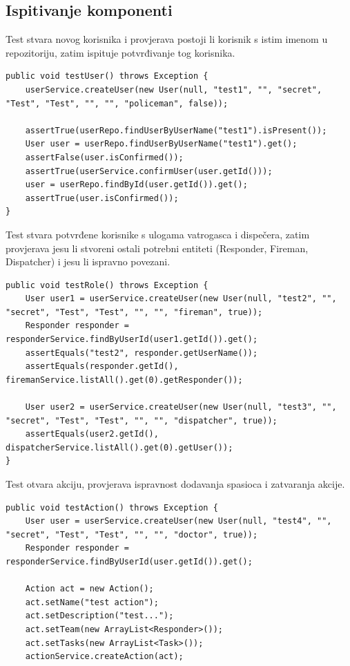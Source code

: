 			\subsection{Ispitivanje komponenti}
			\begin{packed_enum}
			
				\item Test stvara novog korisnika i provjerava postoji li korisnik s istim imenom u repozitoriju, zatim ispituje potvrđivanje tog korisnika.
				\begin{lstlisting}
public void testUser() throws Exception {
	userService.createUser(new User(null, "test1", "", "secret", "Test", "Test", "", "", "policeman", false));
	
	assertTrue(userRepo.findUserByUserName("test1").isPresent());
	User user = userRepo.findUserByUserName("test1").get();
	assertFalse(user.isConfirmed());
	assertTrue(userService.confirmUser(user.getId()));
	user = userRepo.findById(user.getId()).get();
	assertTrue(user.isConfirmed());
}
				\end{lstlisting}
				\item Test stvara potvrđene korisnike s ulogama vatrogasca i dispečera, zatim provjerava jesu li stvoreni ostali potrebni entiteti (Responder, Fireman, Dispatcher) i jesu li ispravno povezani.
				\begin{lstlisting}
public void testRole() throws Exception {
	User user1 = userService.createUser(new User(null, "test2", "", "secret", "Test", "Test", "", "", "fireman", true));
	Responder responder = responderService.findByUserId(user1.getId()).get();
	assertEquals("test2", responder.getUserName());
	assertEquals(responder.getId(), firemanService.listAll().get(0).getResponder());
	
	User user2 = userService.createUser(new User(null, "test3", "", "secret", "Test", "Test", "", "", "dispatcher", true));
	assertEquals(user2.getId(), dispatcherService.listAll().get(0).getUser());
}
				\end{lstlisting}
				\item Test otvara akciju, provjerava ispravnost dodavanja spasioca i zatvaranja akcije.
				\begin{lstlisting}
public void testAction() throws Exception {
	User user = userService.createUser(new User(null, "test4", "", "secret", "Test", "Test", "", "", "doctor", true));
	Responder responder = responderService.findByUserId(user.getId()).get();
	
	Action act = new Action();
	act.setName("test action");
	act.setDescription("test...");
	act.setTeam(new ArrayList<Responder>());
	act.setTasks(new ArrayList<Task>());
	actionService.createAction(act);
	

\end{lstlisting}
\end{packed_enum}
